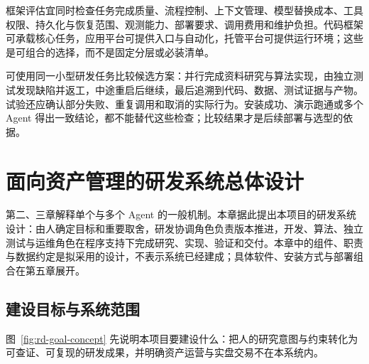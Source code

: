 \documentclass[11pt,a4paper]{article}
\begin{document}
框架评估宜同时检查任务完成质量、流程控制、上下文管理、模型替换成本、工具权限、持久化与恢复范围、观测能力、部署要求、调用费用和维护负担。代码框架可承载核心任务，应用平台可提供入口与自动化，托管平台可提供运行环境；这些是可组合的选择，而不是固定分层或必装清单。

可使用同一小型研发任务比较候选方案：并行完成资料研究与算法实现，由独立测试发现缺陷并返工，中途重启后继续，最后追溯到代码、数据、测试证据与产物。试验还应确认部分失败、重复调用和取消的实际行为。安装成功、演示跑通或多个 Agent 得出一致结论，都不能替代这些检查；比较结果才是后续部署与选型的依据。


\section{面向资产管理的研发系统总体设计}
\label{sec:rd-system-design}

第二、三章解释单个与多个 Agent 的一般机制。本章据此提出本项目的研发系统设计：由人确定目标和重要取舍，研发协调角色负责版本推进，开发、算法、独立测试与运维角色在程序支持下完成研究、实现、验证和交付。本章中的组件、职责与数据约定是拟采用的设计，不表示系统已经建成；具体软件、安装方式与部署组合在第五章展开。

\subsection{建设目标与系统范围}

图~\ref{fig:rd-goal-concept} 先说明本项目要建设什么：把人的研究意图与约束转化为可查证、可复现的研发成果，并明确资产运营与实盘交易不在本系统内。
\end{document}
